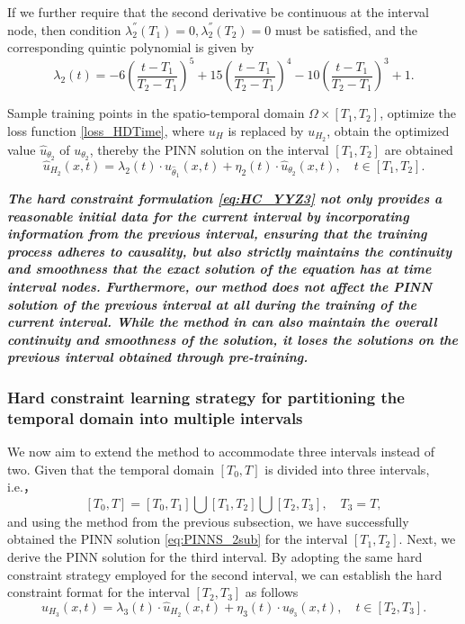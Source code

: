 \documentclass[preprint]{elsarticle}
\numberwithin{table}{section}
\numberwithin{equation}{section}
\numberwithin{figure}{section}
\begin{document}
\begin{CJK}{UTF8}{gbsn}
If we further require that the second derivative be continuous at the interval node, then condition $\lambda^{''}_2(T_1)=0,\lambda^{''}_2(T_2)=0$ must be satisfied, and the corresponding quintic polynomial is given by 
$$\lambda_2(t)=-6\left(\frac{t- T_1}{T_2-T_1}\right)^5+15\left(\frac{t- T_1}{T_2-T_1}\right)^4-10\left(\frac{t- T_1}{T_2-T_1}\right)^3+1.$$




Sample training points in the spatio-temporal   domain $\Omega\times[T_1,T_2]$, optimize the loss function \eqref{loss_HDTime}, where $u_H$ is replaced by $u_{H_2}$, obtain the optimized value  
$\hat{u}_{\theta_2}$
  of $u_{\theta_2}$, thereby the PINN solution on the interval $[T_1,T_2]$ are obtained
\begin{equation}\label{eq:PINNS_2sub}
     \hat{u}_{H_2}(x,t) = \lambda_2(t)\cdot u_{\hat\theta_1}(x,t) + \eta_2(t)\cdot \hat{u}_{\theta_2}(x,t),\quad t\in [T_1,T_2].
\end{equation}
  
  
   \textbf{\textit{The hard constraint formulation \eqref{eq:HC_YYZ3} not only provides a reasonable initial data for the current interval by incorporating information from the previous interval, ensuring that the training process adheres to causality, but also strictly maintains the continuity and smoothness that   the exact solution of the equation has at time interval nodes. Furthermore, our method does not affect the PINN solution of the previous interval at all during the training of the current interval. While the method in \cite{guo2023pretraining} can also maintain the overall continuity and smoothness of the solution, it loses the solutions on the previous interval obtained through pre-training.}}

\subsubsection{Hard constraint learning strategy for partitioning the temporal domain  into multiple intervals}


We now aim to extend the method to accommodate three intervals instead of two. Given that  the temporal domain  $[T_0,T]$ is divided into three intervals, i.e.，
$$[T_0, T]=[T_0, T_1]\bigcup[T_1,T_2]\bigcup[T_2,T_3],\quad T_3=T,$$
and using the method from the previous subsection, we have successfully obtained the PINN solution \eqref{eq:PINNS_2sub} for the interval $[T_1,T_2]$. Next, we derive   the PINN solution for the third interval. By adopting the same hard constraint strategy employed for the second interval, we can establish the hard constraint format for the interval $[T_2,T_3]$ as follows
\begin{equation}\label{eq:HC_sub3}
     u_{H_3}(x,t) = \lambda_3(t)\cdot \hat{u}_{H_2}(x,t) + \eta_3(t)\cdot u_{\theta_3}(x,t),\quad t\in [T_2,T_3].
\end{equation}


\end{CJK}
\end{document}
